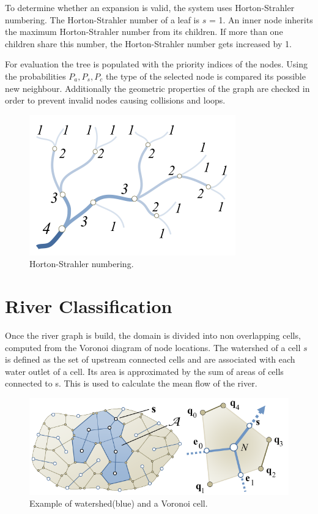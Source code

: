 To determine whether an expansion is valid, the system uses Horton-Strahler numbering. The Horton-Strahler number of a leaf  is $s$ = 1. An inner node inherits the maximum Horton-Strahler number from its children. If more than one children share this number, the Horton-Strahler number gets increased by 1.

For evaluation the tree is populated with the priority indices of the nodes. Using the probabilities  $P_a, P_s, P_c$ the type of the selected node is compared its possible new neighbour. Additionally the geometric properties of the graph are checked in order to prevent invalid nodes causing collisions and loops.  
\begin{figure}[htb]
	\centering
	\includegraphics[width=0.5\linewidth]{GGG13/horton-strahler}
	\caption{Horton-Strahler numbering.}
	\label{fig:horton_strahler}
\end{figure}

\section{River Classification}
Once the river graph is build, the domain is divided into non overlapping cells, computed from the Voronoi diagram of node locations.  
The watershed of a cell $s$ is defined as the set of upstream connected cells and are associated with each water outlet of a cell. Its area is approximated by the sum of areas of cells connected to s. This is used to calculate the mean flow of the river. 

\begin{figure}[htb]
	\centering
	\includegraphics[width=\linewidth]{GGG13/voronoi_watershed}
	\caption{Example of watershed(blue) and a Voronoi cell.}
	\label{fig:voronoi_watershed}
\end{figure}

